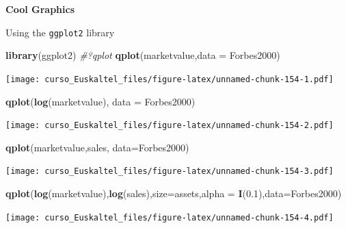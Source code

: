 \documentclass[]{book}
\newenvironment{Shaded}{\begin{snugshade}}{\end{snugshade}}
\newcommand{\KeywordTok}[1]{\textcolor[rgb]{0.13,0.29,0.53}{\textbf{#1}}}
\newcommand{\DataTypeTok}[1]{\textcolor[rgb]{0.13,0.29,0.53}{#1}}
\newcommand{\FloatTok}[1]{\textcolor[rgb]{0.00,0.00,0.81}{#1}}
\newcommand{\CommentTok}[1]{\textcolor[rgb]{0.56,0.35,0.01}{\textit{#1}}}
\newcommand{\NormalTok}[1]{#1}
\begin{document}
\textbf{Cool Graphics}

Using the \texttt{ggplot2} library

\begin{Shaded}
\begin{Highlighting}[]
\KeywordTok{library}\NormalTok{(ggplot2)}
\CommentTok{#?qplot}
\KeywordTok{qplot}\NormalTok{(marketvalue,}\DataTypeTok{data =}\NormalTok{ Forbes2000)}
\end{Highlighting}
\end{Shaded}

\texttt{[image: curso\_Euskaltel\_files/figure-latex/unnamed-chunk-154-1.pdf]}

\begin{Shaded}
\begin{Highlighting}[]
\KeywordTok{qplot}\NormalTok{(}\KeywordTok{log}\NormalTok{(marketvalue),  }\DataTypeTok{data =}\NormalTok{ Forbes2000)}
\end{Highlighting}
\end{Shaded}

\texttt{[image: curso\_Euskaltel\_files/figure-latex/unnamed-chunk-154-2.pdf]}

\begin{Shaded}
\begin{Highlighting}[]
\KeywordTok{qplot}\NormalTok{(marketvalue,sales, }\DataTypeTok{data=}\NormalTok{Forbes2000)}
\end{Highlighting}
\end{Shaded}

\texttt{[image: curso\_Euskaltel\_files/figure-latex/unnamed-chunk-154-3.pdf]}

\begin{Shaded}
\begin{Highlighting}[]
\KeywordTok{qplot}\NormalTok{(}\KeywordTok{log}\NormalTok{(marketvalue),}\KeywordTok{log}\NormalTok{(sales),}\DataTypeTok{size=}\NormalTok{assets,}\DataTypeTok{alpha =} \KeywordTok{I}\NormalTok{(}\FloatTok{0.1}\NormalTok{),}\DataTypeTok{data=}\NormalTok{Forbes2000)}
\end{Highlighting}
\end{Shaded}

\texttt{[image: curso\_Euskaltel\_files/figure-latex/unnamed-chunk-154-4.pdf]}
\end{document}
